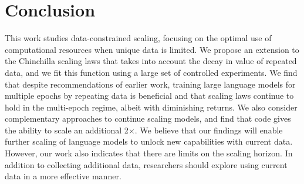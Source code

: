\documentclass{article}
\begin{document}




\section{Conclusion}

This work studies data-constrained scaling, focusing on the optimal use of computational resources when unique data is limited. We propose an extension to the Chinchilla scaling laws that takes into account the decay in value of repeated data, and we fit this function using a large set of controlled experiments. We find that despite recommendations of earlier work, training large language models for multiple epochs by repeating data is beneficial and that scaling laws continue to hold in the multi-epoch regime, albeit with diminishing returns. We also consider complementary approaches to continue scaling models, and find that code gives the ability to scale an additional 2$\times$. We believe that our findings will enable further scaling of language models to unlock new capabilities with current data. However, our work also indicates that there are limits on the scaling horizon. In addition to collecting additional data, researchers should explore using current data in a more effective manner. 
\end{document}
